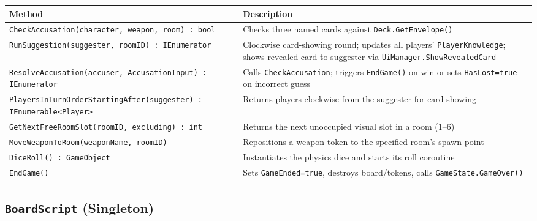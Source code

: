 \begin{table}[H]
\centering
\footnotesize
\setlength{\tabcolsep}{4pt}
\begin{tabular}{|p{4.2cm}|p{5.5cm}|}
\hline
\textbf{Method} & \textbf{Description} \\ \hline
\texttt{CheckAccusation(\allowbreak character, weapon, \allowbreak room) : bool} & Checks three named cards against \texttt{Deck.\allowbreak GetEnvelope()} \\ \hline
\texttt{RunSuggestion(\allowbreak suggester, \allowbreak roomID) : \allowbreak IEnumerator} & Clockwise card-showing round; updates all players' \texttt{PlayerKnowledge}; shows revealed card to suggester via \texttt{UiManager.ShowRevealedCard} \\ \hline
\texttt{ResolveAccusation(\allowbreak accuser, \allowbreak Accusation\-Input) : \allowbreak IEnumerator} & Calls \texttt{CheckAccusation}; triggers \texttt{EndGame()} on win or sets \texttt{HasLost=true} on incorrect guess \\ \hline
\texttt{PlayersInTurnOrder\-StartingAfter(suggester) \allowbreak : IEnumerable\allowbreak <Player>} & Returns players clockwise from the suggester for card-showing \\ \hline
\texttt{GetNextFreeRoomSlot(\allowbreak roomID, excluding) \allowbreak : int} & Returns the next unoccupied visual slot in a room (1--6) \\ \hline
\texttt{MoveWeaponToRoom(\allowbreak weaponName, \allowbreak roomID)} & Repositions a weapon token to the specified room's spawn point \\ \hline
\texttt{DiceRoll() \allowbreak : GameObject} & Instantiates the physics dice and starts its roll coroutine \\ \hline
\texttt{EndGame()} & Sets \texttt{GameEnded=true}, destroys board/tokens, calls \texttt{GameState.GameOver()} \\ \hline
\end{tabular}
\end{table}

\subsection*{\texttt{BoardScript} (Singleton)}

